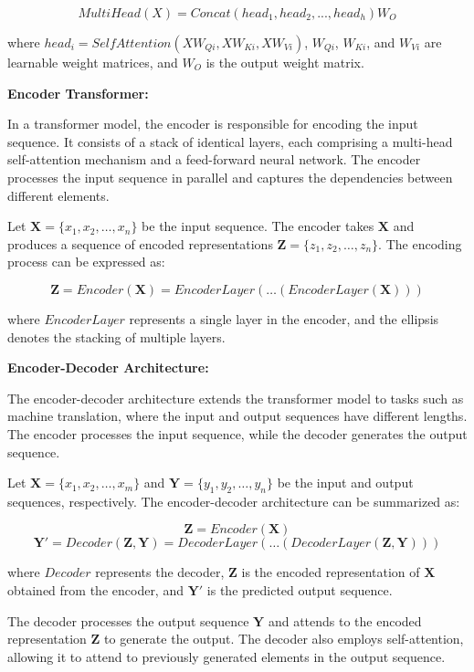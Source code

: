 \documentclass[a4paper,12pt]{article}
\begin{document}
$$MultiHead(X) = Concat(head_1, head_2, ..., head_h)W_O$$

where $head_i = SelfAttention(XW_{Qi}, XW_{Ki}, XW_{Vi})$, $W_{Qi}$, $W_{Ki}$, and $W_{Vi}$ are learnable weight matrices, and $W_O$ is the output weight matrix.

\textbf{Encoder Transformer:}

In a transformer model, the encoder is responsible for encoding the input sequence. It consists of a stack of identical layers, each comprising a multi-head self-attention mechanism and a feed-forward neural network. The encoder processes the input sequence in parallel and captures the dependencies between different elements.

Let $\mathbf{X} = \{x_1, x_2, \ldots, x_n\}$ be the input sequence. The encoder takes $\mathbf{X}$ and produces a sequence of encoded representations $\mathbf{Z} = \{z_1, z_2, \ldots, z_n\}$. The encoding process can be expressed as:

$$\mathbf{Z} = Encoder(\mathbf{X}) = EncoderLayer(\ldots(EncoderLayer(\mathbf{X})))$$

where $EncoderLayer$ represents a single layer in the encoder, and the ellipsis denotes the stacking of multiple layers.

\textbf{Encoder-Decoder Architecture:}

The encoder-decoder architecture extends the transformer model to tasks such as machine translation, where the input and output sequences have different lengths. The encoder processes the input sequence, while the decoder generates the output sequence.

Let $\mathbf{X} = \{x_1, x_2, \ldots, x_m\}$ and $\mathbf{Y} = \{y_1, y_2, \ldots, y_n\}$ be the input and output sequences, respectively. The encoder-decoder architecture can be summarized as:

$$\mathbf{Z} = Encoder(\mathbf{X})$$
$$\mathbf{Y'} = Decoder(\mathbf{Z}, \mathbf{Y}) = DecoderLayer(\ldots(DecoderLayer(\mathbf{Z}, \mathbf{Y})))$$

where $Decoder$ represents the decoder, $\mathbf{Z}$ is the encoded representation of $\mathbf{X}$ obtained from the encoder, and $\mathbf{Y'}$ is the predicted output sequence.

The decoder processes the output sequence $\mathbf{Y}$ and attends to the encoded representation $\mathbf{Z}$ to generate the output. The decoder also employs self-attention, allowing it to attend to previously generated elements in the output sequence.
\end{document}
